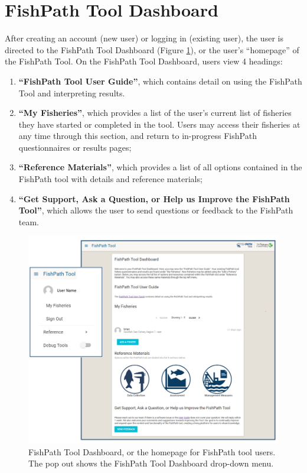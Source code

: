 \documentclass[
  11pt,
]{book}
\providecommand{\tightlist}{%
  \setlength{\itemsep}{0pt}\setlength{\parskip}{0pt}}
\begin{document}
\hypertarget{fishpath-tool-dashboard}{%
\section{FishPath Tool Dashboard}\label{fishpath-tool-dashboard}}

After creating an account (new user) or logging in (existing user), the user is directed to the FishPath Tool Dashboard (Figure \ref{fig:dashboard}), or the user's ``homepage'' of the FishPath Tool. On the FishPath Tool Dashboard, users view 4 headings:

\begin{enumerate}
\def\labelenumi{\arabic{enumi}.}
\tightlist
\item
  \textbf{``FishPath Tool User Guide''}, which contains detail on using the FishPath Tool and interpreting results.
\item
  \textbf{``My Fisheries''}, which provides a list of the user's current list of fisheries they have started or completed in the tool. Users may access their fisheries at any time through this section, and return to in-progress FishPath questionnaires or results pages;
\item
  \textbf{``Reference Materials''}, which provides a list of all options contained in the FishPath tool with details and reference materials;
\item
  \textbf{``Get Support, Ask a Question, or Help us Improve the FishPath Tool''}, which allows the user to send questions or feedback to the FishPath team.
\end{enumerate}

\begin{figure}

{\centering \includegraphics[width=0.95\linewidth]{images/user-dashboard} 

}

\caption{FishPath Tool Dashboard, or the homepage for FishPath tool users. The pop out shows the FishPath Tool Dashboard drop-down menu.}\label{fig:dashboard}
\end{figure}
\end{document}
